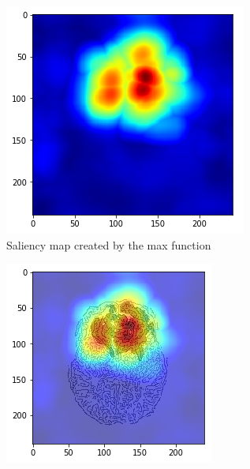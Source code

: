 \begin{figure}[H]
    \centering
    \begin{subfigure}[t]{.4\textwidth}
        \centering
        \includegraphics[width=\linewidth]{chapters/04_segmentation/images/rise_multipixel_max_1-0.png}
        \caption{Saliency map created by the max function}
    \end{subfigure}\hspace{1cm}%
    \begin{subfigure}[t]{.4\textwidth}
        \centering
        \includegraphics[width=\linewidth]{chapters/04_segmentation/images/rise_multipixel_max_1-1.png}

\end{subfigure}
\end{figure}
